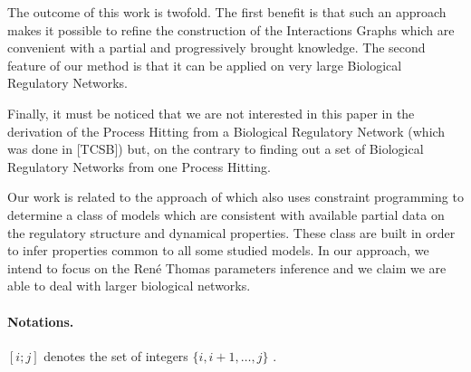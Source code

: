 The outcome of this work is twofold.
The first benefit is that such an approach makes it possible to refine the construction of the Interactions Graphs which are convenient with a partial and progressively brought knowledge.
The second feature of our method is that it can be applied on very large Biological Regulatory Networks.

Finally, it must be noticed that we are not interested in this paper in the derivation of the Process Hitting from a Biological Regulatory Network (which was done in [TCSB]) but, on the contrary to finding out a set of Biological Regulatory Networks from one Process Hitting.

Our work is related to the approach of \cite{20646302,DBLP:conf/ipcat/CorblinFTCT12} which also uses constraint programming to determine a class of models which are consistent with available partial data on the regulatory structure and dynamical properties.
These class are built in order to infer properties common to all some studied models.
In our approach, we intend to focus on the Ren\'e Thomas parameters inference and we claim we are able to deal with larger biological networks.

\medskip
\paragraph{Notations.}
$[i;j]$ denotes the set of integers $\{ i, i+1, \dots, j \}$
.
